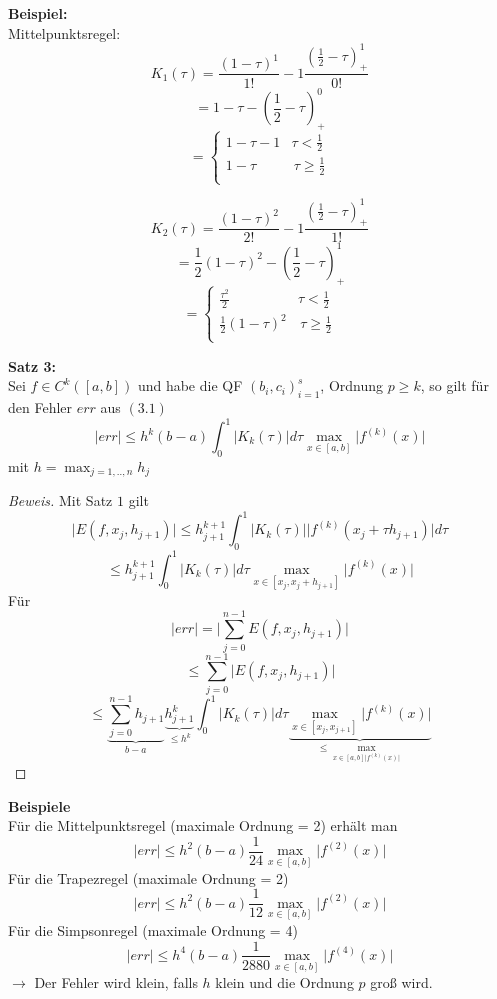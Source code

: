\begin{nothing}
\begin{description}
  \item \textbf{Beispiel:} \\
    Mittelpunktsregel: 
      $$K_1(\tau) = \frac{(1-\tau)^1}{1!} - 1 \frac{(\frac{1}{2} - \tau)^1_+}{0!}$$
      $$= 1- \tau - \left( \frac{1}{2} - \tau \right)_+^0$$
      $$ = \left\{
        \begin{array}{ll}
        1-\tau - 1  & \tau < \frac{1}{2} \\
        1-\tau & \, \tau \geq \frac{1}{2} \\
        \end{array}
      \right. $$
      
      $$K_2(\tau) = \frac{(1-\tau)^2}{2!} - 1 \frac{(\frac{1}{2} - \tau)^1_+}{1!}$$
      $$= \frac{1}{2} (1-\tau)^2 - \left( \frac{1}{2} - \tau \right)_+^1$$
      $$ = \left\{
        \begin{array}{ll}
        \frac{\tau^2}{2}  & \tau < \frac{1}{2} \\
        \frac{1}{2}(1-\tau)^2 & \, \tau \geq \frac{1}{2} \\
        \end{array}
      \right. $$
    
    \item \textbf{Satz 3:} \\
      Sei $f \in C^k([a,b])$ und habe die QF $(b_i, c_i)^s_{i=1}$, Ordnung $p \geq k$, so gilt für den Fehler $err$ aus $(3.1)$ 
      $$ \vert err \vert \leq h^k (b-a) \int_0^1 \vert K_k(\tau) \vert d\tau \max_{x \in [a,b]} \vert f^{(k)}(x) \vert$$
      mit $h = \max_{j=1,..,n} h_j$
    
    \item \begin{proof}[Beweis]
      Mit Satz $1$ gilt 
      $$ \vert E(f, x_j, h_{j+1}) \vert \leq h_{j+1}^{k+1} \int_0^1 \vert K_k(\tau) \vert \vert f^{(k)}(x_j+\tau h_{j+1}) \vert d\tau$$
      $$ \leq h_{j+1}^{k+1} \int_0^1 \vert K_k(\tau) \vert d\tau \max_{x \in [x_j, x_j + h_{j+1}]} \vert f^{(k)}(x) \vert $$
      Für 
      $$ \vert err \vert = \vert \sum_{j=0}^{n-1} E(f, x_j, h_{j+1}) \vert $$
      $$ \leq \sum_{j=0}^{n-1} \vert E(f, x_j, h_{j+1}) \vert $$
      $$ \leq \underbrace{\sum_{j=0}^{n-1} h_{j+1}}_{b-a} \underbrace{h_{j+1}^k}_{\leq h^k} \int_0^1 \vert K_k(\tau) \vert d\tau \underbrace{\max_{x \in [x_j, x_{j+1}]} \vert f^{(k)} (x) \vert}_{\leq \max_{x\in[a,b] \vert f^{(k)}(x) \vert}}$$
    \end{proof}
    
    \item \textbf{Beispiele} \\
      Für die Mittelpunktsregel (maximale Ordnung = 2) erhält man
      $$ \vert err \vert \leq h^2 (b-a) \frac{1}{24} \max_{x\in[a,b]} \vert f^{(2)}(x) \vert $$ 
      Für die Trapezregel (maximale Ordnung = 2)
      $$ \vert err \vert \leq h^2 (b-a) \frac{1}{12} \max_{x\in[a,b]} \vert f^{(2)}(x) \vert $$  
      Für die Simpsonregel (maximale Ordnung = 4)
      $$ \vert err \vert \leq h^4 (b-a) \frac{1}{2880} \max_{x\in[a,b]} \vert f^{(4)}(x) \vert $$ 
      $\rightarrow$ Der Fehler wird klein, falls $h$ klein und die Ordnung $p$ groß wird.
\end{description}
\end{nothing}